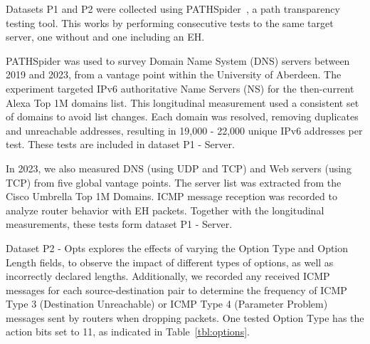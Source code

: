 \documentclass[conference]{IEEEtran}
\begin{document}
Datasets P1 and P2 were collected using
PATHSpider~\cite{learmonth2016pathspider}, a path transparency testing tool. This works by performing consecutive tests to the same target server, one without and one including an EH.

PATHSpider was used to survey Domain Name System (DNS) servers between 2019 and 2023, from a vantage point within the University of Aberdeen.
The experiment targeted IPv6 authoritative Name Servers (NS) for the
then-current Alexa Top 1M domains list. This longitudinal measurement used a consistent set of domains to avoid list changes. Each
domain was resolved, removing duplicates and unreachable addresses, resulting
in 19,000 - 22,000 unique IPv6 addresses per test. These tests are included in dataset P1 - Server.

In 2023, we also measured DNS (using UDP and TCP) and Web servers (using TCP) 
from five global vantage points.
The server list was extracted from the Cisco Umbrella Top 1M Domains. ICMP message reception was recorded to analyze router behavior with EH packets. Together with the longitudinal measurements, these tests form dataset P1 - Server.



Dataset P2 - Opts explores the effects of varying
the Option Type and Option Length fields, to observe the impact of
different types of options, as well as incorrectly declared lengths. Additionally, we recorded any received ICMP messages for each
source-destination pair to determine the frequency of ICMP Type 3 (Destination
Unreachable) or ICMP Type 4 (Parameter Problem) messages sent by routers when
dropping packets. One tested
Option Type has the action bits set to 11, as indicated in
Table~\ref{tbl:options}.
\end{document}
